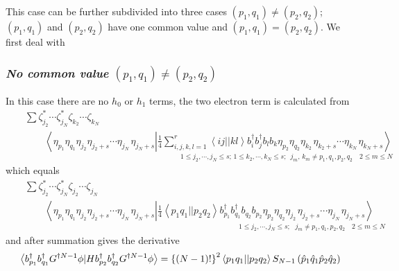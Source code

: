 This case can be further subdivided into three cases $\left(
p_{1},q_{1}\right) \neq \left( p_{2},q_{2}\right) $; $\left(
p_{1},q_{1}\right) $ and $\left( p_{2},q_{2}\right) $ have one common value
and $\left( p_{1},q_{1}\right) =\left( p_{2},q_{2}\right) $. We first deal
with

\subsubsection{{\it No common value }$\left( p_{1},q_{1}\right) \neq \left(
p_{2},q_{2}\right) $}

In this case there are no $h_{0}$ or $h_{1}$ terms, the two electron term is
calculated from 
\begin{eqnarray}
&&\sum \zeta _{j_{2}}^{\ast }\cdots \zeta _{j_{N}}^{\ast }\zeta
_{k_{2}}\cdots \zeta _{k_{N}}  \nonumber \\
&&\qquad \left\langle \eta _{p_{1}}\eta _{q_{1}}\eta _{j_{2}}\eta
_{j_{2}+s}\cdots \eta _{j_{N}\,}\eta _{j_{N}+s}\left| \frac{1}{4}%
\sum_{i,j,k,l=1}^{r}\left\langle ij||kl\right\rangle b_{i}^{\dagger
}b_{j}^{\dagger }b_{l}b_{k}\eta _{p_{2}}\eta _{q_{2}}\eta _{k_{2}\,}\eta
_{k_{2}+s}\cdots \eta _{k_{N}\,}\eta _{k_{N}+s}\right. \right\rangle 
\nonumber \\
&&\qquad \qquad \qquad \qquad \qquad \qquad \qquad \qquad _{1\leq
j_{2},\cdots ,j_{N}\leq s;\,1\leq k_{2},\cdots ,k_{N}\leq
s;\,\,\,j_{m},\,k_{m}\neq p_{1},q_{1},p_{2},q_{2}\quad 2\leq m\leq N}
\end{eqnarray}%
which equals 
\begin{eqnarray}
&&\sum \zeta _{j_{2}}^{\ast }\cdots \zeta _{j_{N}}^{\ast }\zeta
_{j_{2}}\cdots \zeta _{j_{N}}  \nonumber \\
&&\qquad \left\langle \eta _{p_{1}}\eta _{q_{1}}\eta _{j_{2}}\eta
_{j_{2}+s}\cdots \eta _{j_{N}\,}\eta _{j_{N}+s}\left| \frac{1}{4}%
\left\langle p_{1}q_{1}||p_{2}q_{2}\right\rangle b_{p_{1}}^{\dagger
}b_{q_{1}}^{\dagger }b_{q_{2}}b_{p_{2}}\eta _{p_{2}}\eta _{q_{2}}\eta
_{j_{2}\,}\eta _{j_{2}+s}\cdots \eta _{j_{N}\,}\eta _{j_{N}+s}\right.
\right\rangle  \nonumber \\
&&\qquad \qquad \qquad \qquad \qquad \qquad \qquad \qquad \qquad \qquad
\qquad _{1\leq j_{2},\cdots ,j_{N}\leq s;\,\,\,\,j_{m}\neq
p_{1},q_{1},p_{2},q_{2}\quad 2\leq m\leq N}
\end{eqnarray}%
and after summation gives the derivative 
\begin{equation}
\left\langle b_{p_{1}}^{\dagger }b_{q_{1}}^{\dagger }G^{\dagger N-1}\phi
|Hb_{p_{2}}^{\dagger }b_{q_{2}}^{\dagger }G^{\dagger N-1}\phi \right\rangle
=\left\{ \left( N-1\right) !\right\} ^{2}\left\langle
p_{1}q_{1}||p_{2}q_{2}\right\rangle S_{N-1}\left( \hat{p}_{1}\hat{q}_{1}\hat{%
p}_{2}\hat{q}_{2}\right)
\end{equation}

